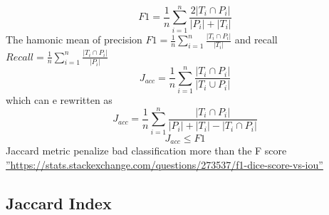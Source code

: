 \documentclass[10pt]{article}
\begin{document}
\paragraph{}
 $$F1 =\frac{1}{n}\sum_{i=1}^{n} \frac{2|{T_i}\cap{P_i}|}{|P_i|+|T_i|}$$
 The hamonic mean of precision $F1 =\frac{1}{n}\sum_{i=1}^{n} \frac{|{T_i}\cap{P_i}|}{|T_i|}$ and recall$Recall =\frac{1}{n}\sum_{i=1}^{n} \frac{|{T_i}\cap{P_i}|}{|P_i|}$
 $$J_{acc} =\frac{1}{n}\sum_{i=1}^{n} \frac{|{T_i}\cap{P_i}|}{|{T_i}\cup{P_i}|}$$
 which can e rewritten as
 $$J_{acc} =\frac{1}{n}\sum_{i=1}^{n} \frac{|{T_i}\cap{P_i}|}{|P_i|+|T_i|-|{T_i}\cap{P_i}|}$$
 $$J_{acc}\leq{F1}$$
Jaccard metric penalize bad classification more than the F score \hyperref[besteval]{''https://stats.stackexchange.com/questions/273537/f1-dice-score-vs-iou''}

\subsection{Jaccard Index}
   
\end{document}
